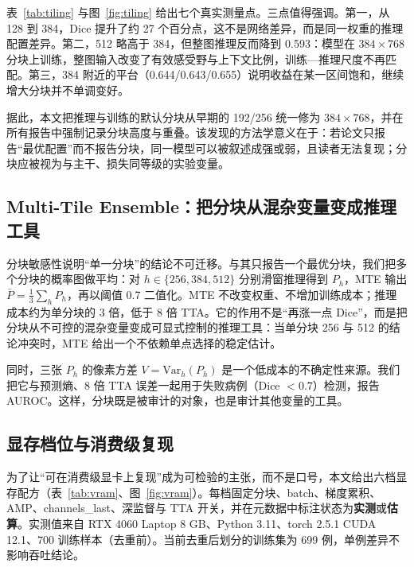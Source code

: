 表~\ref{tab:tiling} 与图~\ref{fig:tiling} 给出七个真实测量点。三点值得强调。第一，从 128 到 384，Dice 提升了约 27 个百分点，这不是网络差异，而是同一权重的推理配置差异。第二，512 略高于 384，但整图推理反而降到 0.593：模型在 $384\times768$ 分块上训练，整图输入改变了有效感受野与上下文比例，训练—推理尺度不再匹配。第三，384 附近的平台（0.644/0.643/0.655）说明收益在某一区间饱和，继续增大分块并不单调变好。



据此，本文把推理与训练的默认分块从早期的 192/256 统一修为 $384\times768$，并在所有报告中强制记录分块高度与重叠。该发现的方法学意义在于：若论文只报告“最优配置”而不报告分块，同一模型可以被叙述成强或弱，且读者无法复现；分块应被视为与主干、损失同等级的实验变量。

\subsection{Multi-Tile Ensemble：把分块从混杂变量变成推理工具}\label{sec:mte-system}

分块敏感性说明“单一分块”的结论不可迁移。与其只报告一个最优分块，我们把多个分块的概率图做平均：对 $h\in\{256,384,512\}$ 分别滑窗推理得到 $P_h$，MTE 输出 $\bar P=\frac{1}{3}\sum_h P_h$，再以阈值 0.7 二值化。MTE 不改变权重、不增加训练成本；推理成本约为单分块的 3 倍，低于 8 倍 TTA。它的作用不是“再涨一点 Dice”，而是把分块从不可控的混杂变量变成可显式控制的推理工具：当单分块 256 与 512 的结论冲突时，MTE 给出一个不依赖单点选择的稳定估计。

同时，三张 $P_h$ 的像素方差 $V=\mathrm{Var}_h(P_h)$ 是一个低成本的不确定性来源。我们把它与预测熵、8 倍 TTA 误差一起用于失败病例（Dice $<0.7$）检测，报告 AUROC。这样，分块既是被审计的对象，也是审计其他变量的工具。

\subsection{显存档位与消费级复现}\label{sec:vram}

为了让“可在消费级显卡上复现”成为可检验的主张，而不是口号，本文给出六档显存配方（表~\ref{tab:vram}、图~\ref{fig:vram}）。每档固定分块、batch、梯度累积、AMP、channels\_last、深监督与 TTA 开关，并在元数据中标注状态为\textbf{实测}或\textbf{估算}。实测值来自 RTX 4060 Laptop 8 GB、Python 3.11、torch 2.5.1 CUDA 12.1、700 训练样本（去重前）。当前去重后划分的训练集为 699 例，单例差异不影响吞吐结论。

